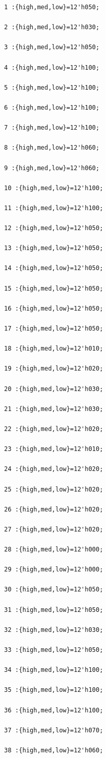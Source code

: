 \documentclass[UTF8]{ctexart}
\begin{document}
\begin{verbatim}
1 :{high,med,low}=12'h050;

2 :{high,med,low}=12'h030;

3 :{high,med,low}=12'h050;

4 :{high,med,low}=12'h100;

5 :{high,med,low}=12'h100;

6 :{high,med,low}=12'h100;

7 :{high,med,low}=12'h100;

8 :{high,med,low}=12'h060;

9 :{high,med,low}=12'h060;

10 :{high,med,low}=12'h100;

11 :{high,med,low}=12'h100;

12 :{high,med,low}=12'h050;

13 :{high,med,low}=12'h050;

14 :{high,med,low}=12'h050;

15 :{high,med,low}=12'h050;

16 :{high,med,low}=12'h050;

17 :{high,med,low}=12'h050;

18 :{high,med,low}=12'h010;

19 :{high,med,low}=12'h020;

20 :{high,med,low}=12'h030;

21 :{high,med,low}=12'h030;

22 :{high,med,low}=12'h020;

23 :{high,med,low}=12'h010;

24 :{high,med,low}=12'h020;

25 :{high,med,low}=12'h020;

26 :{high,med,low}=12'h020;

27 :{high,med,low}=12'h020;

28 :{high,med,low}=12'h000;

29 :{high,med,low}=12'h000;

30 :{high,med,low}=12'h050;

31 :{high,med,low}=12'h050;

32 :{high,med,low}=12'h030;

33 :{high,med,low}=12'h050;

34 :{high,med,low}=12'h100;

35 :{high,med,low}=12'h100;

36 :{high,med,low}=12'h100;

37 :{high,med,low}=12'h070;

38 :{high,med,low}=12'h060;


\end{verbatim}
\end{document}
